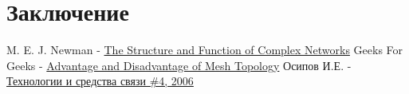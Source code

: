 \documentclass[a4paper]{article}
\begin{document}
\section{Заключение}

\begin{thebibliography}{}
      M. E. J. Newman -  \href{https://github.com/julproh/Thesis}{The Structure and Function of Complex Networks}
      Geeks For Geeks -  \href{https://www.geeksforgeeks.org/advantage-and-disadvantage-of-mesh-topology/}{Advantage and Disadvantage of Mesh Topology}
      Осипов И.Е. -  \href{http://lib.tssonline.ru/articles2/fix-op/mesh_seti_techn_prilozh_oborud}{Технологии и средства связи \#4, 2006}
\end{thebibliography}
\end{document}
